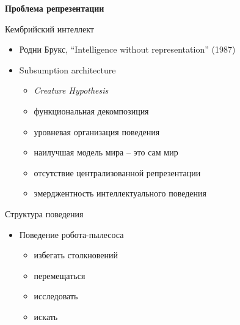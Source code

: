 \documentclass{beamer}
\begin{document}
%
%

\begin{frame}{}
\begin{center}
	\textbf{Проблема репрезентации}
\end{center}
\end{frame}

\begin{frame}{Кембрийский интеллект}
\begin{itemize}
	\item Родни Брукс, ``Intelligence without representation'' (1987)
	\bigskip
	\item Subsumption architecture
	    \medskip
    	\begin{itemize}
	        \item \textit{Creature Hypothesis}
	        \medskip
    	    \item функциональная декомпозиция	        
	        \medskip
	        \item уровневая организация поведения
    	    \medskip
    	    \item наилучшая модель мира -- это сам мир
	        \medskip
	        \item отсутствие централизованной репрезентации
	        \medskip
	        \item эмерджентность интеллектуального поведения
    	\end{itemize}	
\end{itemize}
\end{frame}

\begin{frame}{Структура поведения}
\begin{itemize}
	\item Поведение робота-пылесоса
	\bigskip
	\begin{itemize}
	    \item избегать столкновений
	    \medskip
	    \item перемещаться
	    \medskip
	    \item исследовать
	    \medskip
	    \item искать
	\end{itemize}
\end{itemize}
\end{frame}
\end{document}
